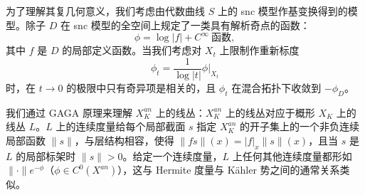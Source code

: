 
为了理解其复几何意义，我们考虑由代数曲线 $S$ 上的 snc 模型作基变换得到的模型。除子 $D$ 在 snc 模型的全空间上规定了一类具有解析奇点的函数：
\[
\phi=\log|f|+C^\infty\ \text{函数},
\]
其中 $f$ 是 $D$ 的局部定义函数。当我们考虑对 $X_t$ 上限制作重新标度
\[
\phi_t=\frac{1}{\log|t|}\phi|_{X_t}
\]
时，在 $t\to 0$ 的极限中只有奇异项是相关的，且 $\phi_t$ 在混合拓扑下收敛到 $-\phi_D$。

我们通过 GAGA 原理来理解 $X_K^{an}$ 上的线丛：$X_K^{an}$ 上的线丛对应于概形 $X_K$ 上的线丛 $L$。$L$ 上的连续度量给每个局部截面 $s$ 指定 $X_K^{an}$ 的开子集上的一个非负连续局部函数 $\|s\|$，与层结构相容，使得 $\|fs\|(x)=|f|_x\|s\|(x)$，且当 $s$ 是 $L$ 的局部标架时 $\|s\|>0$。给定一个连续度量，$L$ 上任何其他连续度量都形如 $\|\cdot\|e^{-\phi}$（$\phi\in C^0(X^{an})$），这与 Hermite 度量与 Kähler 势之间的通常关系类似。

